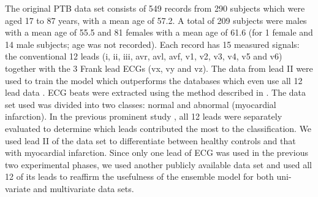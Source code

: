 \documentclass{ieeeaccess}
\begin{document}
The original PTB data set consists of 549 records from 290 subjects which were aged 17 to 87 years, with a mean age of 57.2. A total of 209 subjects were males with a mean age of 55.5 and 81 females with a mean age of 61.6 (for 1 female and 14 male subjects; age was not recorded). Each record has 15 measured signals: the conventional 12 leads (i, ii, iii, avr, avl, avf, v1, v2, v3, v4, v5 and v6) together with the 3 Frank lead ECGs (vx, vy and vz). The data from lead II were used to train the model which outperforms the databases which even use all 12 lead data \cite{ptb}. ECG beats were extracted using the method described in \cite{8419425}. The data set used was divided into two classes: normal and abnormal (myocardial infarction).
In the previous prominent study \cite{10.1007/978-3-030-64610-3_40}, all 12 leads were separately evaluated to determine which leads contributed the most to the classification. We used lead II of the data set to differentiate between healthy controls and that with myocardial infarction. 
Since only one lead of ECG was used in the previous two experimental phases, we used another publicly available data set and used all 12 of its leads to reaffirm the usefulness of the ensemble model for both uni-variate and multivariate data sets.
\end{document}
